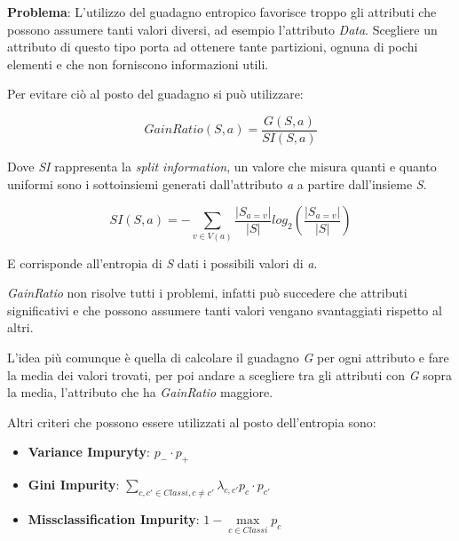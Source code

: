 \textbf{Problema}: L'utilizzo del guadagno entropico favorisce troppo
gli attributi che possono assumere tanti valori diversi, ad esempio
l'attributo \emph{Data}. 
Scegliere un attributo di questo tipo porta ad ottenere tante partizioni, ognuna di pochi
elementi e che non forniscono informazioni utili.

Per evitare ciò al posto del guadagno si può utilizzare:

$$
GainRatio(S, a) = \frac{G(S, a)}{SI(S,a)}
$$

Dove \emph{SI} rappresenta la \emph{split information}, un valore che
misura quanti e quanto uniformi sono i sottoinsiemi generati
dall'attributo \emph{a} a partire dall'insieme \emph{S}.

$$
SI(S,a) = - \sum_{v \in V(a)}\frac{|S_{a = v}|}{|S|} log_2(\frac{|S_{a = v}|}{|S|})
$$

E corrisponde all'entropia di \emph{S} dati i possibili valori di
\emph{a}.

\emph{GainRatio} non risolve tutti i problemi, infatti può succedere che
attributi significativi e che possono assumere tanti valori vengano
svantaggiati rispetto al altri.

L'idea più comunque è quella di calcolare il guadagno \emph{G} per ogni
attributo e fare la media dei valori trovati, per poi andare a
scegliere tra gli attributi con \emph{G} sopra la media,
l'attributo che ha \emph{GainRatio} maggiore.

Altri criteri che possono essere utilizzati al posto dell'entropia sono:

\begin{itemize}
	\item \textbf{Variance Impuryty}: $p_- \cdot p_+$
	\item \textbf{Gini Impurity}: $\sum_{c,c' \in Classi, c\neq c'} \lambda_{c,c'}p_c \cdot p_{c'}$
	\item \textbf{Missclassification Impurity}: $1 - \max\limits_{c \in Classi} p_c$
\end{itemize}